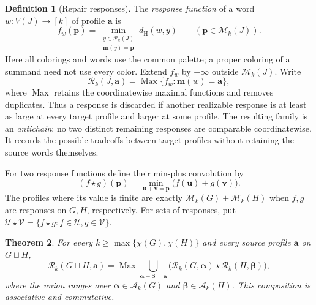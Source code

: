 \documentclass[10pt,a4paper]{amsart}
\numberwithin{equation}{section}
\newtheorem{theorem}{Theorem}[section]
\theoremstyle{definition}
\newtheorem{definition}[theorem]{Definition}
\theoremstyle{remark}
\begin{document}
\begin{definition}[Repair responses]\label{def:responses}
The \emph{response function} of a word $w:V(J)\to[k]$ of profile
$\mathbf a$ is
\[
 f_w(\mathbf p)=
 \min_{\substack{y\in\mathcal P_k(J)\\\mathbf m(y)=\mathbf p}}
       d_{\mathrm H}(w,y)
 \qquad(\mathbf p\in\mathcal M_k(J)).
\]
Here all colorings and words use the common palette; a proper coloring
of a summand need not use every color. Extend $f_w$ by $+\infty$
outside $\mathcal M_k(J)$. Write
\[
 \mathcal R_k(J,\mathbf a)
 =\operatorname{Max}\{f_w:\mathbf m(w)=\mathbf a\},
\]
where $\operatorname{Max}$ retains the coordinatewise maximal
functions and removes duplicates. Thus a response is discarded if
another realizable response is at least as large at every target
profile and larger at some profile. The resulting family is an
\emph{antichain}: no two distinct remaining responses are comparable
coordinatewise. It records the possible tradeoffs between target
profiles without retaining the source words themselves.

For two response functions define their min-plus convolution by
\[
 (f\star g)(\mathbf p)
 =\min_{\mathbf u+\mathbf v=\mathbf p}
       \bigl(f(\mathbf u)+g(\mathbf v)\bigr).
\]
The profiles where its value is finite are exactly
$\mathcal M_k(G)+\mathcal M_k(H)$ when $f,g$ are responses on
$G,H$, respectively. For sets of responses, put
$\mathcal U\star\mathcal V=\{f\star g:f\in\mathcal U,
g\in\mathcal V\}$.
\end{definition}

\begin{theorem}\label{union:ordinary-composition}
For every $k\ge\max\{\chi(G),\chi(H)\}$ and every source profile
$\mathbf a$ on $G\sqcup H$,
\begin{equation}\label{union:frontier-composition}
\mathcal R_k(G\sqcup H,\mathbf a)
=\operatorname{Max}
\bigcup_{\boldsymbol\alpha+\boldsymbol\beta=\mathbf a}
\bigl(\mathcal R_k(G,\boldsymbol\alpha)
      \star\mathcal R_k(H,\boldsymbol\beta)\bigr),
\end{equation}
where the union ranges over
$\boldsymbol\alpha\in\mathcal A_k(G)$ and
$\boldsymbol\beta\in\mathcal A_k(H)$.
This composition is associative and commutative.
\end{theorem}
\end{document}

